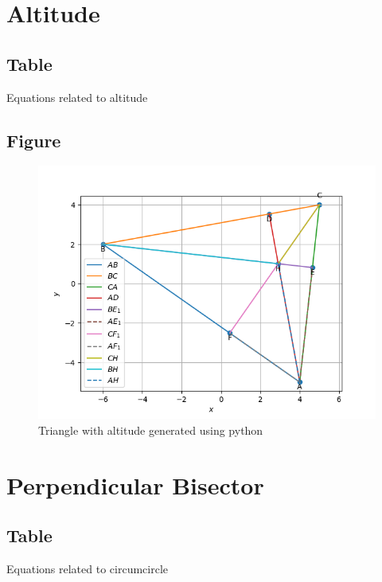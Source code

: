\documentclass[journal,12pt,onecolumn]{IEEEtran}
\theoremstyle{remark}
\begin{document}
\section{Altitude}
\subsection{Table}
\begin{table}[!htb]
	
	\caption{Equations related to altitude}
	\label{tab58:equations_altitude}	
\end{table}
\subsection{Figure}
\begin{figure}[!htb]
	\centering
	\includegraphics[width=\columnwidth]{figs/3.png}
	\caption{Triangle with altitude generated using python}
	\label{fig58:Triangle_with_altitude}	
\end{figure}

\section{Perpendicular Bisector}
\subsection{Table}
\begin{table}[!htb]
	
	\caption{Equations related to circumcircle}
	\label{tab58:equations_circumcenter}	
\end{table}
\end{document}
